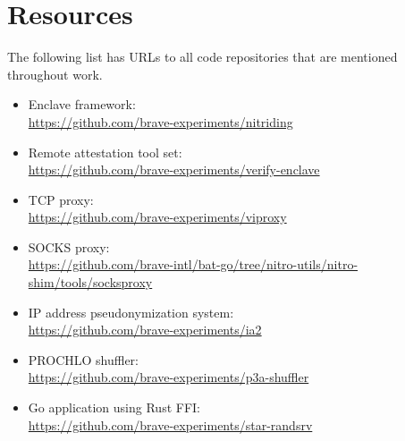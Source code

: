 \section*{Resources}

The following list has URLs to all code repositories that are mentioned
throughout work.

\begin{itemize}
  \item Enclave framework:\\
    {\small \url{https://github.com/brave-experiments/nitriding}}

  \item Remote attestation tool set:\\
    {\small \url{https://github.com/brave-experiments/verify-enclave}}

  \item TCP proxy:\\
    {\small \url{https://github.com/brave-experiments/viproxy}}

  \item SOCKS proxy:\\
    {\small \url{https://github.com/brave-intl/bat-go/tree/nitro-utils/nitro-shim/tools/socksproxy}}

  \item IP address pseudonymization system:\\
    {\small \url{https://github.com/brave-experiments/ia2}}

  \item PROCHLO shuffler:\\
    {\small \url{https://github.com/brave-experiments/p3a-shuffler}}

  \item Go application using Rust FFI:\\
    {\small \url{https://github.com/brave-experiments/star-randsrv}}

\end{itemize}

